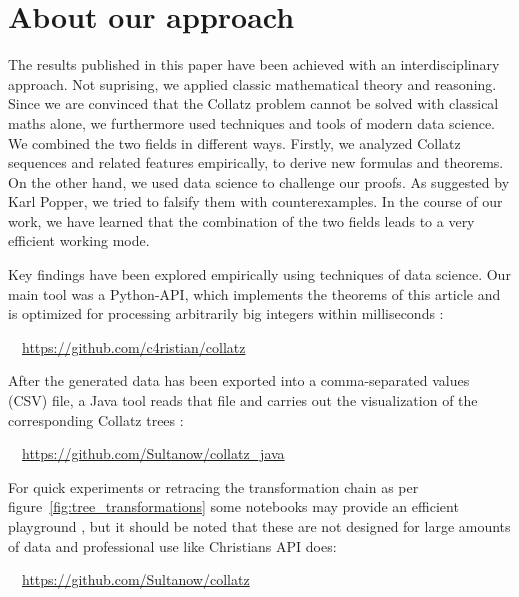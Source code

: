 \chapter*{About our approach}
\label{ch:our_approach}
\vspace{0.8cm}

The results published in this paper have been achieved with an interdisciplinary approach. Not suprising, we applied classic mathematical theory and reasoning. Since we are convinced that the Collatz problem cannot be solved with classical maths alone, we furthermore used techniques and tools of modern data science. We combined the two fields in different ways. Firstly, we analyzed Collatz sequences and related features empirically, to derive new formulas and theorems. On the other hand, we used data science to challenge our proofs. As suggested by Karl Popper, we tried to falsify them with counterexamples. In the course of our work, we have learned that the combination of the two fields leads to a very efficient working mode.

Key findings have been explored empirically using techniques of data science. Our main tool was a Python-API, which implements the theorems of this article and is optimized for processing arbitrarily big integers within milliseconds \cite{Ref_Koch_Github}:

\par\bigskip
\textcolor{wisogreen}\faExternalLink~~\url{https://github.com/c4ristian/collatz}

\par\bigskip\noindent
After the generated data has been exported into a comma-separated values (CSV) file, a Java tool reads that file and carries out the visualization of the corresponding Collatz trees \cite{Ref_Sultanow_Github_Java}:

\par\bigskip
\textcolor{wisogreen}\faExternalLink~~\url{https://github.com/Sultanow/collatz_java}

\par\bigskip
For quick experiments or retracing the transformation chain as per figure~\ref{fig:tree_transformations} some notebooks may provide an efficient playground \cite{Ref_Sultanow_Github}, but it should be noted that these are not designed for large amounts of data and professional use like Christians API does:

\par\bigskip
\textcolor{wisogreen}\faExternalLink~~\url{https://github.com/Sultanow/collatz}